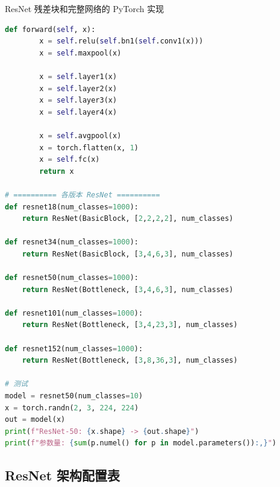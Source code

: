 \begin{mycode}{ResNet 残差块和完整网络的 PyTorch 实现}
\begin{lstlisting}[language=Python]
    def forward(self, x):
        x = self.relu(self.bn1(self.conv1(x)))
        x = self.maxpool(x)

        x = self.layer1(x)
        x = self.layer2(x)
        x = self.layer3(x)
        x = self.layer4(x)

        x = self.avgpool(x)
        x = torch.flatten(x, 1)
        x = self.fc(x)
        return x

# ========== 各版本 ResNet ==========
def resnet18(num_classes=1000):
    return ResNet(BasicBlock, [2,2,2,2], num_classes)

def resnet34(num_classes=1000):
    return ResNet(BasicBlock, [3,4,6,3], num_classes)

def resnet50(num_classes=1000):
    return ResNet(Bottleneck, [3,4,6,3], num_classes)

def resnet101(num_classes=1000):
    return ResNet(Bottleneck, [3,4,23,3], num_classes)

def resnet152(num_classes=1000):
    return ResNet(Bottleneck, [3,8,36,3], num_classes)

# 测试
model = resnet50(num_classes=10)
x = torch.randn(2, 3, 224, 224)
out = model(x)
print(f"ResNet-50: {x.shape} -> {out.shape}")
print(f"参数量: {sum(p.numel() for p in model.parameters()):,}")
\end{lstlisting}
\end{mycode}

\subsection{ResNet 架构配置表}

